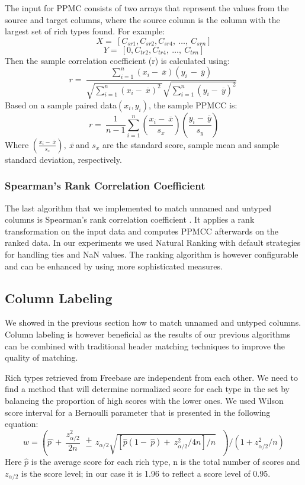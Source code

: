 \documentclass{sig-alternate}
\begin{document}
The input for PPMC consists of two arrays that represent the values from the source and target columns, where the source column is the column with the largest set of rich types found. For example:
\[X=\ \left[C_{sr1},C_{sr2},C_{sr4},\ \dots ,\ C_{srn}\right]\] 
\[Y=\ \left[0,C_{tr2},C_{tr4},\ \dots ,\ C_{trn}\right]\] 
Then the sample correlation coefficient (r) is calculated using:
\[r=\ \frac{\sum^n_{i=1}{\left(x_i-\ \overline{x}\right)\left(y_{i\ }-\ \overline{y}\right)}}{\sqrt{\sum^n_{i=1}{{\left(x_i-\ \overline{x}\right)}^{2\ }}}\sqrt{\sum^n_{i=1}{{\left(y_i-\ \overline{y}\right)}^2}}}\ \] 
Based on a sample paired data$\left(x_i,y_i\right)$, the sample PPMCC is:
\[r=\ \frac{1}{n-1}\sum^n_{i=1}{\left(\frac{x_i-\ \overline{x}}{s_x}\right)}\left(\frac{y_i-\ \overline{y}}{s_y}\right)\] 
Where $\left(\frac{x_i-\ \overline{x}}{s_x}\right),\ \overline{x\ }$and $s_x$ are the standard score, sample mean and sample standard deviation, respectively.


\subsubsection{Spearman's Rank Correlation Coefficient}
The last algorithm that we implemented to match unnamed and untyped columns is Spearman's rank correlation coefficient \cite{books/daglib/0020904}. It applies a rank transformation on the input data and computes PPMCC afterwards on the ranked data. In our experiments we used Natural Ranking with default strategies for handling ties and NaN values. The ranking algorithm is however configurable and can be enhanced by using more sophisticated measures. 


\subsection{Column Labeling}
We showed in the previous section how to match unnamed and untyped columns. Column labeling is however beneficial as the results of our previous algorithms can be combined with traditional header matching techniques to improve the quality of matching.

Rich types retrieved from Freebase are independent from each other. We need to find a method that will determine normalized score for each type in the set by balancing the proportion of high scores with the lower ones. We used Wilson score interval for a Bernoulli parameter that is presented in the following equation:
\[w={\left(\widehat{p\ }+\ \frac{z^2_{{\alpha }/{2}}}{2n}\  \begin{array}{c}
+ \\ 
- \end{array}
z_{{\alpha }/{2}}\sqrt{{\left[\hat{p}\left(1-\ \hat{p}\right)+\ {z^2_{{\alpha }/{2}}}/{4n}\right]}/{n}}\ \ \ \right)}/{\left(1+{z^2_{{\alpha }/{2}}}/{n}\right)}\] 
Here $\hat{p}$ is the average score for each rich type, n is the total number of scores and $z_{{\alpha }/{2}}$ is the score level; in our case it is 1.96 to reflect a score level of 0.95.
\end{document}
